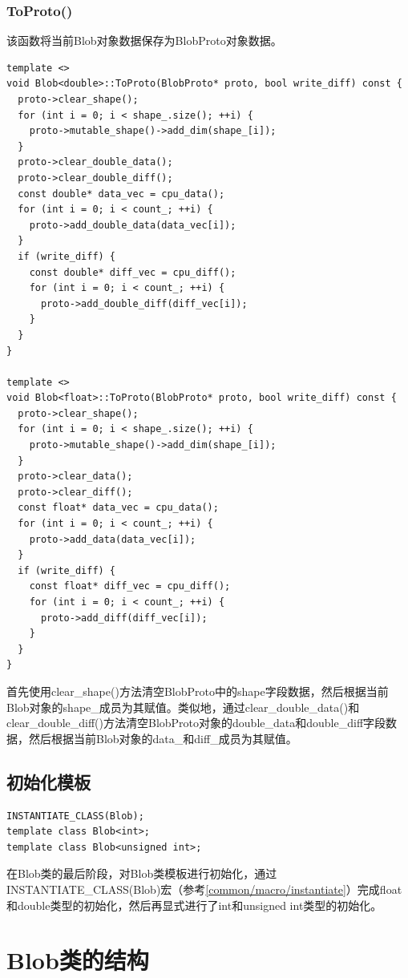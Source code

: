\subsubsection{ToProto()}
该函数将当前Blob对象数据保存为BlobProto对象数据。
\begin{verbatim}
template <>
void Blob<double>::ToProto(BlobProto* proto, bool write_diff) const {
  proto->clear_shape();
  for (int i = 0; i < shape_.size(); ++i) {
    proto->mutable_shape()->add_dim(shape_[i]);
  }
  proto->clear_double_data();
  proto->clear_double_diff();
  const double* data_vec = cpu_data();
  for (int i = 0; i < count_; ++i) {
    proto->add_double_data(data_vec[i]);
  }
  if (write_diff) {
    const double* diff_vec = cpu_diff();
    for (int i = 0; i < count_; ++i) {
      proto->add_double_diff(diff_vec[i]);
    }
  }
}

template <>
void Blob<float>::ToProto(BlobProto* proto, bool write_diff) const {
  proto->clear_shape();
  for (int i = 0; i < shape_.size(); ++i) {
    proto->mutable_shape()->add_dim(shape_[i]);
  }
  proto->clear_data();
  proto->clear_diff();
  const float* data_vec = cpu_data();
  for (int i = 0; i < count_; ++i) {
    proto->add_data(data_vec[i]);
  }
  if (write_diff) {
    const float* diff_vec = cpu_diff();
    for (int i = 0; i < count_; ++i) {
      proto->add_diff(diff_vec[i]);
    }
  }
}
\end{verbatim}
首先使用clear\_shape()方法清空BlobProto中的shape字段数据，然后根据当前Blob对象的shape\_成员为其赋值。类似地，通过clear\_double\_data()和clear\_double\_diff()方法清空BlobProto对象的double\_data和double\_diff字段数据，然后根据当前Blob对象的data\_和diff\_成员为其赋值。
\subsection{初始化模板}
\begin{verbatim}
INSTANTIATE_CLASS(Blob);
template class Blob<int>;
template class Blob<unsigned int>;
\end{verbatim}
在Blob类的最后阶段，对Blob类模板进行初始化，通过INSTANTIATE\_CLASS(Blob)宏（参考\ref{common/macro/instantiate}）完成float和double类型的初始化，然后再显式进行了int和unsigned int类型的初始化。
\section{Blob类的结构}
